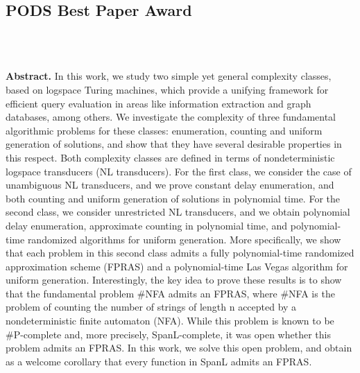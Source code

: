 
\clearpage



\subsection*{PODS Best Paper Award}



~\\~

\textbf{Abstract.} In this work, we study two simple yet general complexity classes, based on logspace Turing machines, which provide a unifying framework for efficient query evaluation in areas like information extraction and graph databases, among others. We investigate the complexity of three fundamental algorithmic problems for these classes: enumeration, counting and uniform generation of solutions, and show that they have several desirable properties in this respect. Both complexity classes are defined in terms of nondeterministic logspace transducers (NL transducers). For the first class, we consider the case of unambiguous NL transducers, and we prove constant delay enumeration, and both counting and uniform generation of solutions in polynomial time. For the second class, we consider unrestricted NL transducers, and we obtain polynomial delay enumeration, approximate counting in polynomial time, and polynomial-time randomized algorithms for uniform generation. More specifically, we show that each problem in this second class admits a fully polynomial-time randomized approximation scheme (FPRAS) and a polynomial-time Las Vegas algorithm for uniform generation. Interestingly, the key idea to prove these results is to show that the fundamental problem \#NFA admits an FPRAS, where \#NFA is the problem of counting the number of strings of length n accepted by a nondeterministic finite automaton (NFA). While this problem is known to be \#P-complete and, more precisely, SpanL-complete, it was open whether this problem admits an FPRAS. In this work, we solve this open problem, and obtain as a welcome corollary that every function in SpanL admits an FPRAS.

